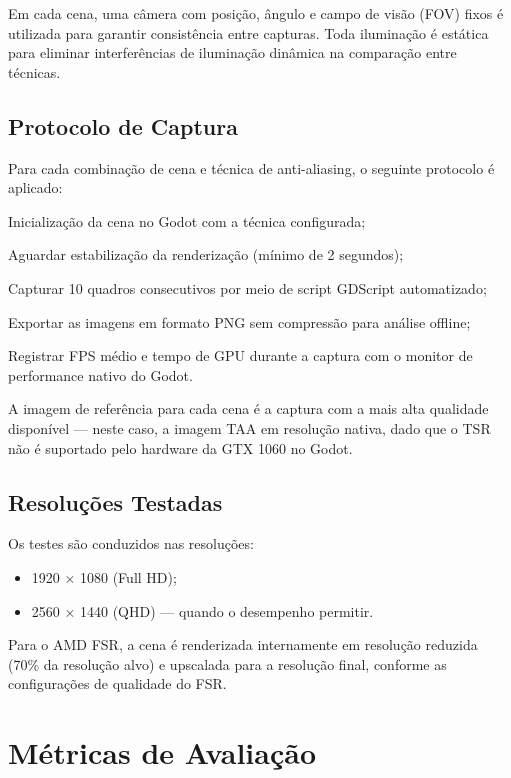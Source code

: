 \documentclass[twoside,english,brazilian]{UNISINOSmonografia}
\begin{document}
Em cada cena, uma câmera com posição, ângulo e campo de visão (FOV) fixos é utilizada para garantir consistência entre capturas. Toda iluminação é estática para eliminar interferências de iluminação dinâmica na comparação entre técnicas.

\subsection{Protocolo de Captura}

Para cada combinação de cena e técnica de anti-aliasing, o seguinte protocolo é aplicado:

\begin{alineas}
    \item Inicialização da cena no Godot com a técnica configurada;
    \item Aguardar estabilização da renderização (mínimo de 2 segundos);
    \item Capturar 10 quadros consecutivos por meio de script GDScript automatizado;
    \item Exportar as imagens em formato PNG sem compressão para análise offline;
    \item Registrar FPS médio e tempo de GPU durante a captura com o monitor de performance nativo do Godot.
\end{alineas}

A imagem de referência para cada cena é a captura com a mais alta qualidade disponível — neste caso, a imagem TAA em resolução nativa, dado que o TSR não é suportado pelo hardware da GTX 1060 no Godot.

\subsection{Resoluções Testadas}

Os testes são conduzidos nas resoluções:

\begin{itemize}
    \item 1920 × 1080 (Full HD);
    \item 2560 × 1440 (QHD) — quando o desempenho permitir.
\end{itemize}

Para o AMD FSR, a cena é renderizada internamente em resolução reduzida (70\% da resolução alvo) e upscalada para a resolução final, conforme as configurações de qualidade do FSR.

\section{Métricas de Avaliação}
\end{document}

